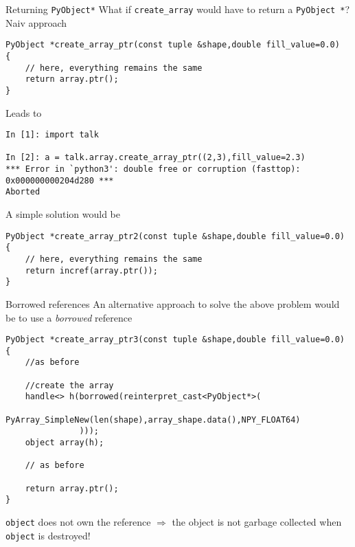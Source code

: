 \begin{frame}[fragile]{Returning \texttt{PyObject*}}
    What if \texttt{create\_array} would have to return a \texttt{PyObject *}?  \\
    \vspace{0.02\textheight}
    Naiv approach
    \begin{verbatim}
PyObject *create_array_ptr(const tuple &shape,double fill_value=0.0)
{
    // here, everything remains the same 
    return array.ptr();
}
    \end{verbatim}
    \vspace{0.02\textheight}
    Leads to
    \begin{verbatim}
In [1]: import talk                                                                                                                                    

In [2]: a = talk.array.create_array_ptr((2,3),fill_value=2.3)
*** Error in `python3': double free or corruption (fasttop): 0x000000000204d280 ***
Aborted
    \end{verbatim}
    \vspace{0.02\textheight}
    A simple solution would be
    \begin{verbatim}
PyObject *create_array_ptr2(const tuple &shape,double fill_value=0.0)
{
    // here, everything remains the same 
    return incref(array.ptr());
}
    \end{verbatim}
\end{frame}


\begin{frame}[fragile]{Borrowed references}
    An alternative approach to solve the above problem would be to use a 
    \emph{borrowed} reference
    \vspace{0.1\textheight}
    \begin{verbatim}
PyObject *create_array_ptr3(const tuple &shape,double fill_value=0.0)
{
    //as before

    //create the array
    handle<> h(borrowed(reinterpret_cast<PyObject*>(
               PyArray_SimpleNew(len(shape),array_shape.data(),NPY_FLOAT64)
               )));
    object array(h);
   
    // as before

    return array.ptr();
}
    \end{verbatim}

    \vspace{0.1\textheight}
    \texttt{object} does not own the reference $\Rightarrow$  the object is not
    garbage collected when \texttt{object} is destroyed!
    
\end{frame}


